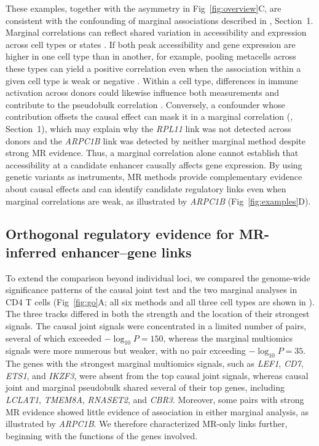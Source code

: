 \noindent These examples, together with the asymmetry in Fig~\ref{fig:overview}C, are consistent with the confounding of marginal associations described in , Section~1. Marginal correlations can reflect shared variation in accessibility and expression across cell types or states \cite{su2025scmultimap,calderon2019landscape}. If both peak accessibility and gene expression are higher in one cell type than in another, for example, pooling metacells across these types can yield a positive correlation even when the association within a given cell type is weak or negative \cite{su2025scmultimap}. Within a cell type, differences in immune activation across donors could likewise influence both measurements and contribute to the pseudobulk correlation \cite{calderon2019landscape}. Conversely, a confounder whose contribution offsets the causal effect can mask it in a marginal correlation (, Section~1), which may explain why the \textit{RPL11} link was not detected across donors and the \textit{ARPC1B} link was detected by neither marginal method despite strong MR evidence. Thus, a marginal correlation alone cannot establish that accessibility at a candidate enhancer causally affects gene expression. By using genetic variants as instruments, MR methods provide complementary evidence about causal effects and can identify candidate regulatory links even when marginal correlations are weak, as illustrated by \textit{ARPC1B} (Fig~\ref{fig:examples}D).

\subsection{Orthogonal regulatory evidence for MR-inferred enhancer--gene links}

\noindent To extend the comparison beyond individual loci, we compared the genome-wide significance patterns of the causal joint test and the two marginal analyses in CD4 T cells (Fig~\ref{fig:go}A; all six methods and all three cell types are shown in ). The three tracks differed in both the strength and the location of their strongest signals. The causal joint signals were concentrated in a limited number of pairs, several of which exceeded \(-\log_{10}P=150\), whereas the marginal multiomics signals were more numerous but weaker, with no pair exceeding \(-\log_{10}P=35\). The genes with the strongest marginal multiomics signals, such as \textit{LEF1}, \textit{CD7}, \textit{ETS1}, and \textit{IKZF3}, were absent from the top causal joint signals, whereas causal joint and marginal pseudobulk shared several of their top genes, including \textit{LCLAT1}, \textit{TMEM8A}, \textit{RNASET2}, and \textit{CBR3}. Moreover, some pairs with strong MR evidence showed little evidence of association in either marginal analysis, as illustrated by \textit{ARPC1B}. We therefore characterized MR-only links further, beginning with the functions of the genes involved.

